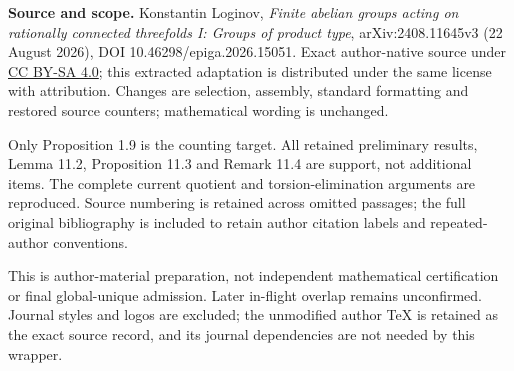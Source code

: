 \noindent\textbf{Source and scope.} Konstantin Loginov, \emph{Finite abelian groups acting on rationally connected threefolds I: Groups of product type}, arXiv:2408.11645v3 (22 August 2026), DOI 10.46298/epiga.2026.15051. Exact author-native source under \href{https://creativecommons.org/licenses/by-sa/4.0/}{CC BY-SA 4.0}; this extracted adaptation is distributed under the same license with attribution. Changes are selection, assembly, standard formatting and restored source counters; mathematical wording is unchanged.
\par\smallskip
\noindent Only Proposition 1.9 is the counting target. All retained preliminary results, Lemma 11.2, Proposition 11.3 and Remark 11.4 are support, not additional items. The complete current quotient and torsion-elimination arguments are reproduced. Source numbering is retained across omitted passages; the full original bibliography is included to retain author citation labels and repeated-author conventions.
\par\smallskip
\noindent This is author-material preparation, not independent mathematical certification or final global-unique admission. Later in-flight overlap remains unconfirmed. Journal styles and logos are excluded; the unmodified author TeX is retained as the exact source record, and its journal dependencies are not needed by this wrapper.
\par\medskip
